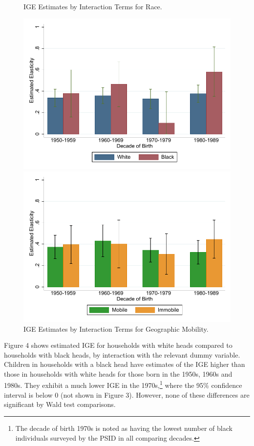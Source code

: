 \documentclass[notitlepage,12pt]{article}
\begin{document}
\begin{figure}
\centering
\begin{minipage}{.47\textwidth}
  \centering
  \caption{IGE Estimates by Interaction Terms for Race.}
  \includegraphics[width=\textwidth]{Graph3.pdf}
  \end{minipage}
\begin{minipage}{.47\textwidth}
  \centering
  \caption{IGE Estimates by Interaction Terms for Geographic Mobility.}
  \includegraphics[width=\textwidth]{Graph4.pdf}
  \end{minipage}
\end{figure}
Figure 4 shows estimated IGE for households with white heads compared to households with black heads, by interaction with the relevant dummy variable.  Children in households with a black head have estimates of the IGE higher than those in households with white heads for those born in the 1950s, 1960s and 1980s.  They exhibit a much lower IGE in the 1970s,\footnote{The decade of birth 1970s is noted as having the lowest number of black individuals surveyed by the PSID in all comparing decades.} where the 95\% confidence interval is below 0 (not shown in Figure 3).  However, none of these differences are significant by Wald test comparisons. 
\end{document}
